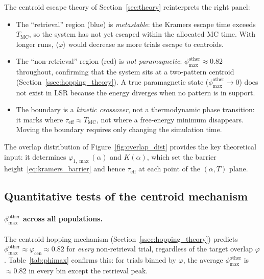 \documentclass[11pt]{article}
\newcommand{\avg}[1]{\langle #1 \rangle}
\begin{document}
The centroid escape theory of Section~\ref{sec:theory} reinterprets the right panel:
\begin{itemize}
\item The ``retrieval'' region (blue) is \emph{metastable}: the Kramers escape time exceeds $T_{\mathrm{MC}}$, so the system has not yet escaped within the allocated MC time.  With longer runs, $\avg{\varphi}$ would decrease as more trials escape to centroids.
\item The ``non-retrieval'' region (red) is \emph{not paramagnetic}: $\phi_{\max}^{\mathrm{other}} \approx 0.82$ throughout, confirming that the system sits at a two-pattern centroid (Section~\ref{ssec:hopping_theory}).  A true paramagnetic state ($\phi_{\max}^{\mathrm{other}} \to 0$) does not exist in LSR because the energy diverges when no pattern is in support.
\item The boundary is a \emph{kinetic crossover}, not a thermodynamic phase transition: it marks where $\tau_{\mathrm{eff}} \approx T_{\mathrm{MC}}$, not where a free-energy minimum disappears.  Moving the boundary requires only changing the simulation time.
\end{itemize}

The overlap distribution of Figure~\ref{fig:overlap_dist} provides the key theoretical input: it determines $\varphi_{1,\max}(\alpha)$ and $K(\alpha)$, which set the barrier height~\eqref{eq:kramers_barrier} and hence $\tau_{\mathrm{eff}}$ at each point of the $(\alpha, T)$ plane.

\subsection{Quantitative tests of the centroid mechanism}
\label{ssec:tests}

\paragraph{$\phi_{\max}^{\mathrm{other}}$ across all populations.}
The centroid hopping mechanism (Section~\ref{ssec:hopping_theory}) predicts $\phi_{\max}^{\mathrm{other}} \approx \varphi_{\mathrm{cen}} \approx 0.82$ for \emph{every} non-retrieval trial, regardless of the target overlap $\varphi$.  Table~\ref{tab:phimax} confirms this: for trials binned by $\varphi$, the average $\phi_{\max}^{\mathrm{other}}$ is $\approx 0.82$ in every bin except the retrieval peak.
\end{document}
